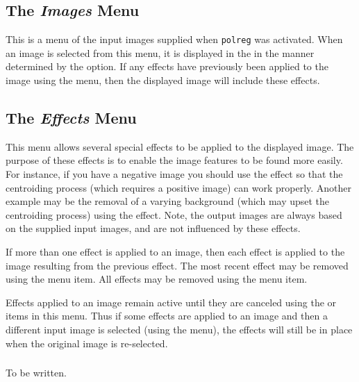 \subsection {The {\em Images} Menu}
This is a menu of the input images supplied when {\tt polreg} was
activated. When an image is selected from this menu, it is displayed in
the  in the manner
determined by the  option. If any
effects have previously been applied to the image using the  menu, then the displayed image will
include these effects.

\subsection {The {\em Effects} Menu}
This menu allows several special effects to be applied to the displayed
image. The purpose of these effects is to enable the image features to be
found more easily. For instance, if you have a negative image you should
use the  effect so that the
centroiding process (which requires a positive image) can work properly.
Another example may be the removal of a varying background (which may upset
the centroiding process) using the
 effect. Note, the output
images are always based on the supplied input images, and are not
influenced by these effects.

If more than one effect is applied to an image, then each effect is
applied to the image resulting from the previous effect. The most recent
effect may be removed using the 
menu item. All effects may be removed using the  menu item.

Effects applied to an image remain active until they are canceled using
the  or
 items in this menu. Thus
if some effects are applied to an image and then a different input image 
is selected (using the  menu), 
the effects will still be in place when the original image is re-selected.

\subsubsection { } To be written.
